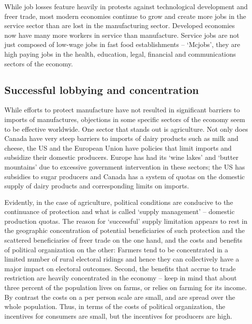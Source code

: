 While job losses feature heavily in protests against technological development and freer trade, most modern economies continue to grow and create more jobs in the service sector than are lost in the manufacturing sector. Developed economies now have many more workers in service than manufacture. Service jobs are not just composed of low-wage jobs in fast food establishments -- `Mcjobs', they are high paying jobs in the health, education, legal, financial and communications sectors of the economy.

\subsection*{Successful lobbying and concentration}

While efforts to protect manufacture have not resulted in significant barriers to imports of manufactures, objections in some specific sectors of the economy seem to be effective worldwide. One sector that stands out is agriculture. Not only does Canada have very steep barriers to imports of dairy products such as milk and cheese, the US and the European Union have policies that limit imports and subsidize their domestic producers. Europe has had its `wine lakes' and `butter mountains' due to excessive government intervention in these sectors; the US has subsidies to sugar producers and Canada has a system of quotas on the domestic supply of dairy products and corresponding limits on imports.

Evidently, in the case of agriculture, political conditions are conducive to the continuance of protection and what is called `supply management' -- domestic production quotas. The reason for `successful' supply limitation appears to rest in the geographic concentration of potential beneficiaries of such protection and the scattered beneficiaries of freer trade on the one hand, and the costs and benefits of political organization on the other: Farmers tend to be concentrated in a limited number of rural electoral ridings and hence they can collectively have a major impact on electoral outcomes. Second, the benefits that accrue to trade restriction are heavily concentrated in the economy -- keep in mind that about three percent of the population lives on farms, or relies on farming for its income. By contrast the costs on a per person scale are small, and are spread over the whole population. Thus, in terms of the costs of political organization, the incentives for consumers are small, but the incentives for producers are high.

